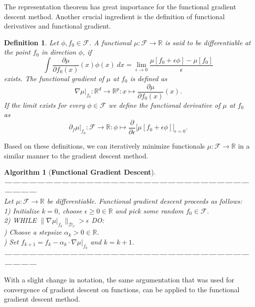 \documentclass[11pt, a4paper]{article}
\newtheorem{definition}[theorem]{Definition}
\newtheorem{algorithm}[theorem]{Algorithm}
\newcommand{\R}{\mathds{R}}
\newcommand{\D}{\mathcal{D}}
\newcommand{\F}{\mathcal{F}}
\begin{document}
The representation theorem has great importance for the functional gradient descent method. Another crucial ingredient is the definition of functional derivatives and functional gradient.

\begin{definition} \label{def:derivative}
Let $\phi, f_0 \in \F$. A functional $\mu: \F \to \R$ is said to be differentiable at the point $f_0$ in direction $\phi$, if
\[ \int \frac{\partial\mu}{\partial f_0(x)}(x)\phi(x) \ dx = \lim_{\epsilon \to 0} \frac{\mu[f_0 + \epsilon \phi] - \mu[f_0]}{\epsilon} \]
exists. The functional gradient of $\mu$ at $f_0$ is defined as 
\[ \nabla \mu |_{f_0} : \R^d \to \R^p : x \mapsto \frac{\partial \mu}{\partial f_0(x)}(x). \]
 If the limit exists for every $\phi \in \F$ we define the functional derivative of $\mu$ at $f_0$ as
\[ \partial_{f} \mu |_{f_0} : \F \to \R : \phi \mapsto \frac{\partial}{\partial \epsilon} \Big [ \mu[f_0+\epsilon \phi] \Big ]_{\epsilon=0}. \]
\end{definition}

Based on these definitions, we can iteratively minimize functionals $\mu: \F \to \R$ in a similar manner to the gradient descent method.

\begin{algorithm}[\textbf{Functional Gradient Descent}] \ \\
\textbf{------------------------------------------------------------------------------------------------------} \\
Let $\mu: \F \to \R$ be differentiable. Functional gradient descent proceeds as follows: \\

1) Initialize $k=0$, choose $\epsilon \geq 0 \in \R$ and pick some random $f_0 \in \F$. \\

2) WHILE $ \big \| \nabla \mu |_{f_k} \big \|_{\D_x} > \epsilon $ DO:\\

) Choose a stepsize $\alpha_k > 0 \in \R$. \\

) Set $f_{k+1} = f_k - \alpha_k \cdot \nabla \mu |_{f_k}$ and $k = k+1$. \\
\textbf{------------------------------------------------------------------------------------------------------} 
\end {algorithm}

With a slight change in notation, the same argumentation that was used for convergence of gradient descent on functions, can be applied to the functional gradient descent method. \\
\end{document}
